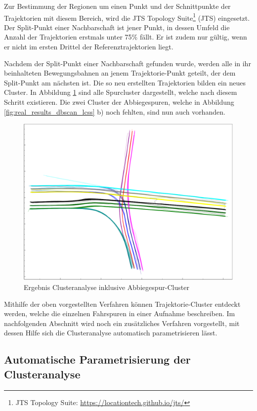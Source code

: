 Zur Bestimmung der Regionen um einen Punkt und der Schnittpunkte der Trajektorien mit diesem Bereich,
wird die JTS Topology Suite\footnote{JTS Topology Suite: \url{https://locationtech.github.io/jts/}}
(JTS) eingesetzt. Der Split-Punkt einer Nachbarschaft ist jener Punkt, in dessen Umfeld die Anzahl der
Trajektorien erstmals unter 75\% fällt. Er ist zudem nur gültig, wenn er nicht im ersten Drittel der
Referenztrajektorien liegt.

Nachdem der Split-Punkt einer Nachbarschaft gefunden wurde, werden alle in ihr beinhalteten Bewegungsbahnen
an jenem Trajektorie-Punkt geteilt, der dem Split-Punkt am nächsten ist.
Die so neu erstellten Trajektorien bilden ein neues Cluster. In Abbildung \ref{fig:real_turning_lane_result}
sind alle Spurcluster dargestellt, welche nach diesem Schritt existieren. Die zwei Cluster der Abbiegespuren,
welche in Abbildung \ref{fig:real_results_dbscan_lcss} b) noch fehlten, sind nun auch vorhanden.

\begin{figure}[H]
    \centering
    \includegraphics[width=0.4\linewidth]{resources/img/umsetzung/U1/clusters_with_turning_lanes2}
    \caption{Ergebnis Clusteranalyse inklusive Abbiegespur-Cluster}
    \label{fig:real_turning_lane_result}
\end{figure}

Mithilfe der oben vorgestellten Verfahren können Trajektorie-Cluster entdeckt werden, welche
die einzelnen Fahrspuren in einer Aufnahme beschreiben. Im nachfolgenden Abschnitt wird noch ein
zusätzliches Verfahren vorgestellt, mit dessen Hilfe sich die Clusteranalyse automatisch parametrisieren lässt.

\subsection{Automatische Parametrisierung der Clusteranalyse}
\label{sec:real1_adjustment_clustering_parameter}

